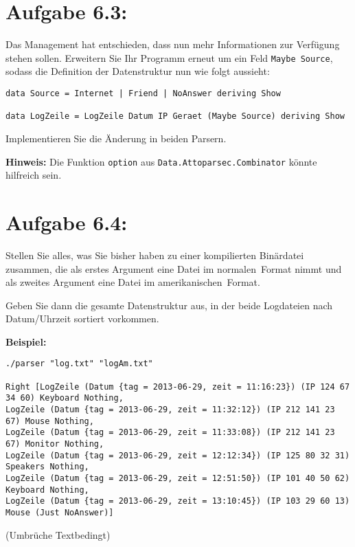 \documentclass[a4paper,10pt]{scrartcl}
\newcommand{\theuebungszettel}{6}
\begin{document}
\section*{Aufgabe \theuebungszettel.3:}
Das Management hat entschieden, dass nun mehr Informationen zur Verfügung stehen sollen. Erweitern Sie Ihr Programm erneut um ein Feld \texttt{Maybe Source}, sodass die Definition der Datenstruktur nun wie folgt aussieht:
\begin{verbatim}
data Source = Internet | Friend | NoAnswer deriving Show

data LogZeile = LogZeile Datum IP Geraet (Maybe Source) deriving Show
\end{verbatim}
Implementieren Sie die Änderung in beiden Parsern.\smallskip

\textbf{Hinweis:} Die Funktion \texttt{option} aus \texttt{Data.Attoparsec.Combinator} könnte hilfreich sein.

\section*{Aufgabe \theuebungszettel.4:}

Stellen Sie alles, was Sie bisher haben zu einer kompilierten Binärdatei zusammen, die als erstes Argument eine Datei im \glqq normalen\grqq \ Format nimmt und als zweites Argument eine Datei im \glqq amerikanischen\grqq \ Format.

Geben Sie dann die gesamte Datenstruktur aus, in der beide Logdateien nach Datum/Uhrzeit sortiert vorkommen.\\\smallskip

\textbf{Beispiel:}\footnotesize
\begin{verbatim}
./parser "log.txt" "logAm.txt"

Right [LogZeile (Datum {tag = 2013-06-29, zeit = 11:16:23}) (IP 124 67 34 60) Keyboard Nothing,
LogZeile (Datum {tag = 2013-06-29, zeit = 11:32:12}) (IP 212 141 23 67) Mouse Nothing,
LogZeile (Datum {tag = 2013-06-29, zeit = 11:33:08}) (IP 212 141 23 67) Monitor Nothing,
LogZeile (Datum {tag = 2013-06-29, zeit = 12:12:34}) (IP 125 80 32 31) Speakers Nothing,
LogZeile (Datum {tag = 2013-06-29, zeit = 12:51:50}) (IP 101 40 50 62) Keyboard Nothing,
LogZeile (Datum {tag = 2013-06-29, zeit = 13:10:45}) (IP 103 29 60 13) Mouse (Just NoAnswer)]
\end{verbatim}
\normalsize
(Umbrüche Textbedingt)
\end{document}

